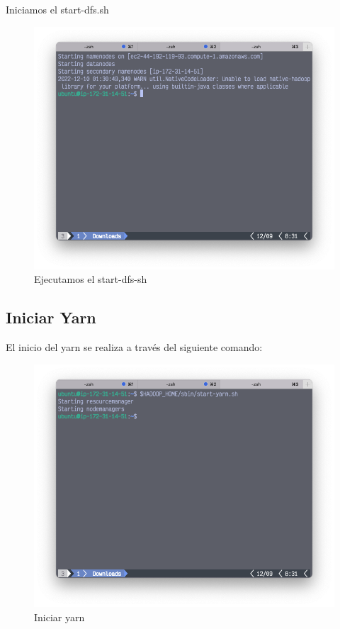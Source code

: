 \clearpage 
Iniciamos el start-dfs.sh
\begin{figure}[h]
	\centering
	\includegraphics[scale=.35] {img/42-start-dfs-sh}
	\caption{Ejecutamos el start-dfs-sh}
	\label{fig:42}	
\end{figure}

\clearpage


\subsection{Iniciar Yarn}
El inicio del yarn se realiza a través del siguiente comando: 
\begin{figure}[h]
	\centering
	\includegraphics[scale=.35] {img/43-start-yarn-sh}
	\caption{Iniciar yarn}
	\label{fig:43}
\end{figure}

